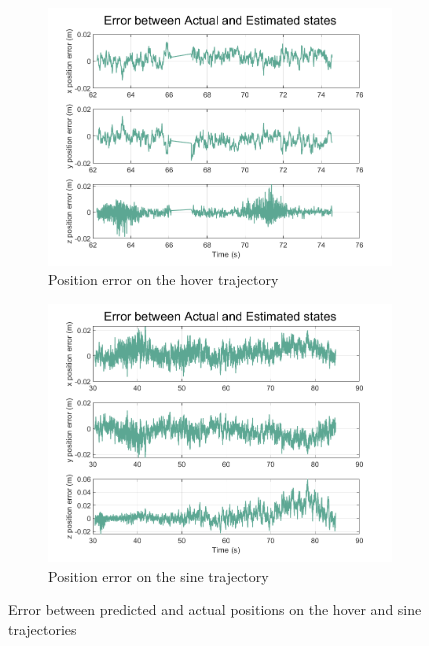 \documentclass[letterpaper, paper,11pt]{AAS}	%
\begin{document}
\begin{figure}[H]
\centering
\begin{subfigure}{.5\textwidth}
	\centering
	\includegraphics[width=\textwidth]{Figures/hover1_err}
	\caption{Position error on the hover trajectory}
	\label{fig:SquareErr5}
\end{subfigure}%
\begin{subfigure}{.5\textwidth}
	\centering
	\includegraphics[width=\textwidth]{Figures/sine1_err}
	\caption{Position error on the sine trajectory}
	\label{fig:SquareErr10}
\end{subfigure}
\caption{Error between predicted and actual positions on the hover and sine trajectories}
\label{fig:SquareErrTwo}
\end{figure}
\end{document}
